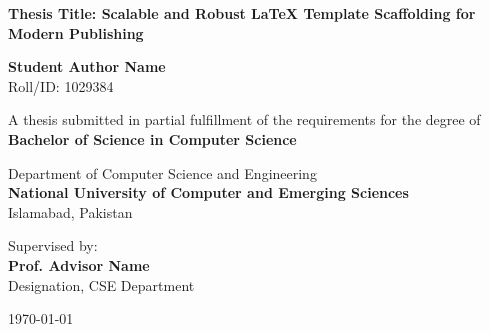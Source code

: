 \begin{titlepage}
\begin{center}
    \vspace*{1cm}
    
    
    \vspace{1.5cm}
    
    {\huge \bfseries \color{primary} Thesis Title: Scalable and Robust LaTeX Template Scaffolding for Modern Publishing}
    
    \vspace{1.5cm}
    
    {\Large \bfseries Student Author Name} \\
    \vspace{0.2cm}
    {Roll/ID: 1029384}
    
    \vspace{1.5cm}
    
    {A thesis submitted in partial fulfillment of the requirements for the degree of} \\
    \vspace{0.3cm}
    {\large \bfseries \color{secondary} Bachelor of Science in Computer Science}
    
    \vspace{1.5cm}
    
    {\large Department of Computer Science and Engineering} \\
    \vspace{0.2cm}
    {\large \bfseries \color{primary} National University of Computer and Emerging Sciences} \\
    \vspace{0.1cm}
    {Islamabad, Pakistan}
    
    \vfill
    
    {Supervised by:} \\
    {\large \bfseries Prof. Advisor Name} \\
    {Designation, CSE Department}
    
    \vspace{1cm}
    
    {\large \today}
    
\end{center}
\end{titlepage}
